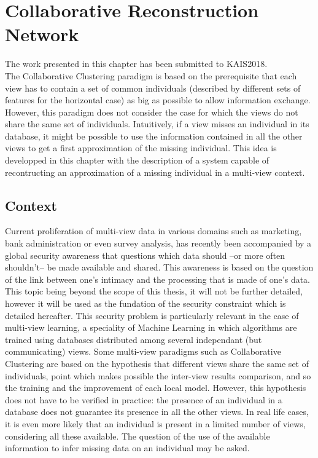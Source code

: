 %
\chapter{Collaborative Reconstruction Network}

The work presented in this chapter has been submitted to KAIS2018.\\

The Collaborative Clustering paradigm is based on the prerequisite that each view has to contain a set of common individuals (described by different sets of features for the horizontal case) as big as possible to allow information exchange. However, this paradigm does not consider the case for which the views do not share the same set of individuals. Intuitively, if a view misses an individual in its database, it might be possible to use the information contained in all the other views to get a first approximation of the missing individual. This idea is developped in this chapter with the description of a system capable of recontructing an approximation of a missing individual in a multi-view context.\\

\section{Context}
\label{sec:crs_context}

Current proliferation of multi-view data in various domains such as marketing, bank administration or even survey analysis, has recently been accompanied by a global security awareness that questions which data should --or more often shouldn't-- be made available and shared. This awareness is based on the question of the link between one's intimacy and the processing that is made of one's data. This topic being beyond the scope of this thesis, it will not be further detailed, however it will be used as the fundation of the security constraint which is detailed hereafter. This security problem is particularly relevant in the case of multi-view learning, a speciality of Machine Learning in which algorithms are trained using databases distributed among several independant (but communicating) views. Some multi-view paradigms such as Collaborative Clustering are based on the hypothesis that different views share the same set of individuals, point which makes possible the inter-view results comparison, and so the training and the improvement of each local model. However, this hypothesis does not have to be verified in practice: the presence of an individual in a database does not guarantee its presence in all the other views. In real life cases, it is even more likely that an individual is present in a limited number of views, considering all these available. The question of the use of the available information to infer missing data on an individual may be asked.
	

